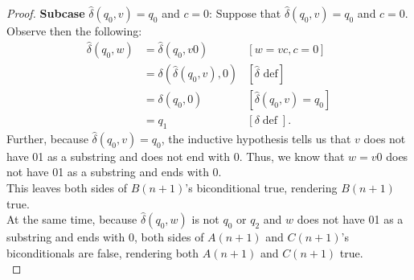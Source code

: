\documentclass[10pt]{article}
\begin{document}
\begin{enumerate}[label={}]
\begin{proof}
                  \textbf{Subcase }$\hat{\delta}\left(q_0, v\right)=q_0$ and $c=0$: Suppose that $\hat{\delta}\left(q_0, v\right)=q_0$ and $c=0$. Observe then the following:
                  $$
                        \begin{aligned}
                              \hat{\delta}\left(q_0, w\right) & =\hat{\delta}\left(q_0, v 0\right)                     & {[w=v c, c=0] }                                     \\
                                                              & =\delta\left(\hat{\delta}\left(q_0, v\right), 0\right) & {[\hat{\delta} \text { def}] }                      \\
                                                              & =\delta\left(q_0, 0\right)                             & {\left[\hat{\delta}\left(q_0, v\right)=q_0\right] } \\
                                                              & =q_1                                                   & {[\delta \operatorname{def}] . }
                        \end{aligned}
                  $$
                  Further, because $\hat{\delta}\left(q_0, v\right)=q_0$, the inductive hypothesis tells us that $v$ does not have 01 as a substring and does not end with 0. Thus, we know that $w=v0$ does not have 01 as a substring and ends with 0.\\
                  This leaves both sides of $B(n+1)$'s biconditional true, rendering $B(n+1)$ true.\\
                  At the same time, because $\hat{\delta}\left(q_0, w\right)$ is not $q_0$ or $q_2$ and $w$ does not have 01 as a substring and ends with 0, both sides of $A(n+1)$ and $C(n+1)$'s biconditionals are false, rendering both $A(n+1)$ and $C(n+1)$ true.\\


\end{proof}
\end{enumerate}
\end{document}
